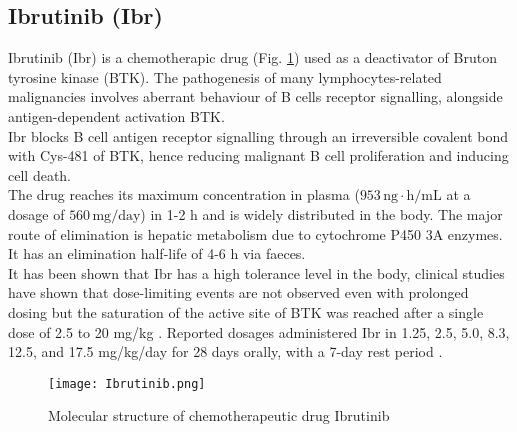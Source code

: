 \subsection{Ibrutinib (Ibr)}
Ibrutinib (Ibr) is a chemotherapic drug (Fig. \ref{fig:Ibr}) used as a deactivator of Bruton tyrosine kinase (BTK). The pathogenesis of many lymphocytes-related malignancies \cite{ibr-1} involves aberrant behaviour of B cells receptor signalling, alongside antigen-dependent activation BTK.\\
Ibr blocks B cell antigen receptor signalling through an irreversible covalent bond with Cys-481 of BTK, hence reducing malignant B cell proliferation and inducing cell death.\\
The drug reaches its maximum concentration in plasma ($953\,\text{ng}\cdot\text{h}/\text{mL}$ at a dosage of $560\,\text{mg}/\text{day}$) in 1-2 h and is widely distributed in the body. The major route of elimination is hepatic metabolism due to cytochrome P450 3A enzymes. It has an elimination half-life of 4-6 h via faeces.\\
It has been shown that Ibr has a high tolerance level in the body, clinical studies have shown that dose-limiting events are not observed even with prolonged dosing \cite{ibr-2} but the saturation of the active site of BTK was reached after a single dose of 2.5 to 20 mg/kg \cite{ibr-pubchem}. Reported dosages administered Ibr in 1.25, 2.5, 5.0, 8.3, 12.5, and 17.5 mg/kg/day for 28 days orally, with a 7-day rest period \cite{ibr-2}.
\begin{figure}[htbp!]
	\centering
	\texttt{[image: Ibrutinib.png]}
	\caption{Molecular structure of chemotherapeutic drug Ibrutinib}
	\label{fig:Ibr}
\end{figure}

